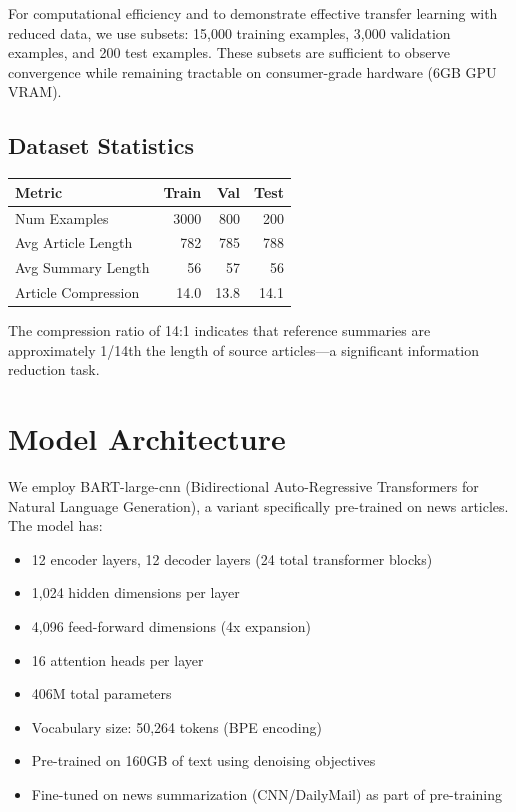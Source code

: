 \documentclass[12pt,a4paper,oneside]{report}
\begin{document}
For computational efficiency and to demonstrate effective transfer learning with reduced data, we use subsets: 15,000 training examples, 3,000 validation examples, and 200 test examples. These subsets are sufficient to observe convergence while remaining tractable on consumer-grade hardware (6GB GPU VRAM).

\subsection{Dataset Statistics}
\begin{table}[H]
\centering
\begin{tabular}{lrrr}
\toprule
\textbf{Metric} & \textbf{Train} & \textbf{Val} & \textbf{Test} \\
\midrule
Num Examples & 3000 & 800 & 200 \\
Avg Article Length & 782 & 785 & 788 \\
Avg Summary Length & 56 & 57 & 56 \\
Article Compression & 14.0 & 13.8 & 14.1 \\
\bottomrule
\end{tabular}
\end{table}

The compression ratio of 14:1 indicates that reference summaries are approximately 1/14th the length of source articles—a significant information reduction task.

\section{Model Architecture}
We employ BART-large-cnn (Bidirectional Auto-Regressive Transformers for Natural Language Generation), a variant specifically pre-trained on news articles. The model has:
\begin{itemize}
    \item 12 encoder layers, 12 decoder layers (24 total transformer blocks)
    \item 1,024 hidden dimensions per layer
    \item 4,096 feed-forward dimensions (4x expansion)
    \item 16 attention heads per layer
    \item 406M total parameters
    \item Vocabulary size: 50,264 tokens (BPE encoding)
    \item Pre-trained on 160GB of text using denoising objectives
    \item Fine-tuned on news summarization (CNN/DailyMail) as part of pre-training
\end{itemize}
\end{document}
